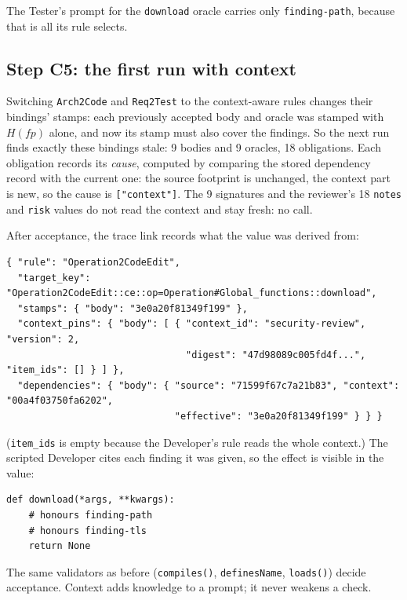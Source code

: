 \documentclass[10pt,a4paper]{article}
\newcommand{\fp}{\mathit{fp}}
\newcommand{\code}[1]{\texttt{#1}}
\theoremstyle{definition}
\begin{document}
\noindent The Tester's prompt for the \code{download} oracle carries only
\code{finding-path}, because that is all its rule selects.

\subsection{Step C5: the first run with context}

Switching \code{Arch2Code} and \code{Req2Test} to the context-aware rules
changes their bindings' stamps: each previously accepted body and oracle was
stamped with $H(\fp)$ alone, and now its stamp must also cover the findings.
So the next run finds exactly these bindings stale: 9 bodies and 9 oracles,
18 obligations. Each obligation records its \emph{cause}, computed by
comparing the stored dependency record with the current one: the source
footprint is unchanged, the context part is new, so the cause is
\code{["context"]}. The 9 signatures and the reviewer's 18 \code{notes} and
\code{risk} values do not read the context and stay fresh: no call.

After acceptance, the trace link records what the value was derived from:

\begin{lstlisting}[style=engine, caption={Trace link of (\code{ce download}, \code{body}) after the run: the pin.}, label={lst:pin}]
{ "rule": "Operation2CodeEdit",
  "target_key": "Operation2CodeEdit::ce::op=Operation#Global_functions::download",
  "stamps": { "body": "3e0a20f81349f199" },
  "context_pins": { "body": [ { "context_id": "security-review", "version": 2,
                                "digest": "47d98089c005fd4f...", "item_ids": [] } ] },
  "dependencies": { "body": { "source": "71599f67c7a21b83", "context": "00a4f03750fa6202",
                              "effective": "3e0a20f81349f199" } } }
\end{lstlisting}

\noindent (\code{item\_ids} is empty because the Developer's rule reads the
whole context.) The scripted Developer cites each finding it was given, so the
effect is visible in the value:

\begin{lstlisting}[style=llm, caption={Accepted body (scripted answer).}]
def download(*args, **kwargs):
    # honours finding-path
    # honours finding-tls
    return None
\end{lstlisting}

\noindent The same validators as before (\code{compiles()},
\code{definesName}, \code{loads()}) decide acceptance. Context adds
knowledge to a prompt; it never weakens a check.
\end{document}
